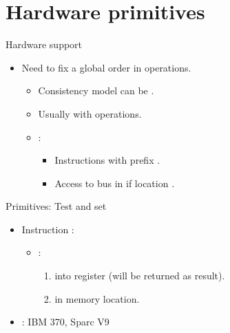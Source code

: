 \section{Hardware primitives}

\begin{frame}[t]{Hardware support}
\begin{itemize}
  \item Need to fix a global order in operations.
    \begin{itemize}
      \item Consistency model can be .

      \item Usually  with  operations.

      \item {}:
        \begin{itemize}
          \item Instructions with prefix .
          \item Access to bus in  if location .
        \end{itemize}
    \end{itemize}
\end{itemize}
\end{frame}

\begin{frame}[t]{Primitives: Test and set}
\begin{itemize}
  \item Instruction :
    \begin{itemize}
      \item {}:
        \begin{enumerate}
          \item {} into register (will be returned as result).
          \item {}  in memory location.
        \end{enumerate}
    \end{itemize}

  \item {}: IBM 370, Sparc V9
      
\end{itemize}
\end{frame}


